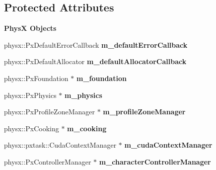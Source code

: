 \subsection*{Protected Attributes}
\begin{Indent}{\bf PhysX Objects}\par
{\em \label{_amgrp5dcec0622931609ebc9147725ef87cd9}
 }\begin{DoxyCompactItemize}
\item 
\hypertarget{classContent_1_1Content_1_1Physics_a0cd121108edd0f94377b7d09bd197e95}{
physx::PxDefaultErrorCallback {\bfseries m\_\-defaultErrorCallback}}
\label{classContent_1_1Content_1_1Physics_a0cd121108edd0f94377b7d09bd197e95}

\item 
\hypertarget{classContent_1_1Content_1_1Physics_aecafb83002c61e1a766fe8ae7e5c1ed7}{
physx::PxDefaultAllocator {\bfseries m\_\-defaultAllocatorCallback}}
\label{classContent_1_1Content_1_1Physics_aecafb83002c61e1a766fe8ae7e5c1ed7}

\item 
\hypertarget{classContent_1_1Content_1_1Physics_a2158fa3ed65a96205657145b5985388c}{
physx::PxFoundation $\ast$ {\bfseries m\_\-foundation}}
\label{classContent_1_1Content_1_1Physics_a2158fa3ed65a96205657145b5985388c}

\item 
\hypertarget{classContent_1_1Content_1_1Physics_a4b091f26878964cdc8a2efdb5e60e73d}{
physx::PxPhysics $\ast$ {\bfseries m\_\-physics}}
\label{classContent_1_1Content_1_1Physics_a4b091f26878964cdc8a2efdb5e60e73d}

\item 
\hypertarget{classContent_1_1Content_1_1Physics_a209c100886890786170a18ee5691f7ab}{
physx::PxProfileZoneManager $\ast$ {\bfseries m\_\-profileZoneManager}}
\label{classContent_1_1Content_1_1Physics_a209c100886890786170a18ee5691f7ab}

\item 
\hypertarget{classContent_1_1Content_1_1Physics_ac9a6f78110608b8ffad574cbc4539291}{
physx::PxCooking $\ast$ {\bfseries m\_\-cooking}}
\label{classContent_1_1Content_1_1Physics_ac9a6f78110608b8ffad574cbc4539291}

\item 
\hypertarget{classContent_1_1Content_1_1Physics_a56fde168569b07395f4afca21ae42b50}{
physx::pxtask::CudaContextManager $\ast$ {\bfseries m\_\-cudaContextManager}}
\label{classContent_1_1Content_1_1Physics_a56fde168569b07395f4afca21ae42b50}

\item 
\hypertarget{classContent_1_1Content_1_1Physics_ab58249099948d112960c9c95bba552ce}{
physx::PxControllerManager $\ast$ {\bfseries m\_\-characterControllerManager}}
\label{classContent_1_1Content_1_1Physics_ab58249099948d112960c9c95bba552ce}

\end{DoxyCompactItemize}
\end{Indent}


